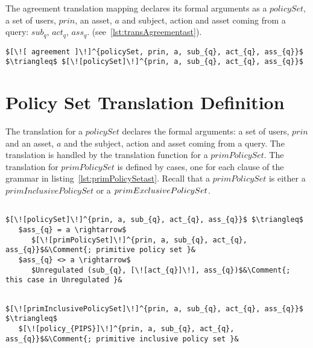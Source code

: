 The agreement translation mapping declares its formal arguments as a $policySet$, a set of users, $prin$, an asset, $a$ and subject, action and asset coming from a query: $sub_{q}$, $ act_{q}$, $ass_{q}$. (see~\ref{lst:transAgreementast}).


\lstset{mathescape, language=AST}  
\begin{lstlisting}[frame=single, caption={Agreement Translation},label={lst:transAgreementast}]
$[\![ agreement ]\!]^{policySet, prin, a, sub_{q}, act_{q}, ass_{q}}$ $\triangleq$ $[\![policySet]\!]^{prin, a, sub_{q}, act_{q}, ass_{q}}$
\end{lstlisting}

\section{Policy Set Translation Definition}
The translation for a $policySet$ declares the formal arguments: a set of users, $prin$ and an asset, $a$ and the subject, action and asset coming from a query. The translation is handled by the translation function for a $primPolicySet$. The translation for $primPolicySet$ is defined by cases, one for each clause of the grammar in listing~\ref{lst:primPolicySetast}. Recall that a $primPolicySet$ is either a $primInclusivePolicySet$ or a $\linebreak primExclusivePolicySet$.

\lstset{mathescape, language=AST}  
\begin{lstlisting}[frame=single, caption={Policy Set Translation Cases},label={lst:transpolicysetdefinitionAST}]

$[\![policySet]\!]^{prin, a, sub_{q}, act_{q}, ass_{q}}$ $\triangleq$ 
   $ass_{q} = a \rightarrow$
      $[\![primPolicySet]\!]^{prin, a, sub_{q}, act_{q}, ass_{q}}$&\Comment{; primitive policy set }&
   $ass_{q} <> a \rightarrow$
      $Unregulated (sub_{q}, [\![act_{q}]\!], ass_{q})$&\Comment{; this case in Unregulated }&
\end{lstlisting}

\lstset{mathescape, language=AST}  
\begin{lstlisting}[frame=single, caption={Primitive Policy Set Translation Cases},label={lst:transpolicysetdefinitionAST}]

$[\![primInclusivePolicySet]\!]^{prin, a, sub_{q}, act_{q}, ass_{q}}$ $\triangleq$ 
   $[\![policy_{PIPS}]\!]^{prin, a, sub_{q}, act_{q}, ass_{q}}$&\Comment{; primitive inclusive policy set }&
\end{lstlisting}

